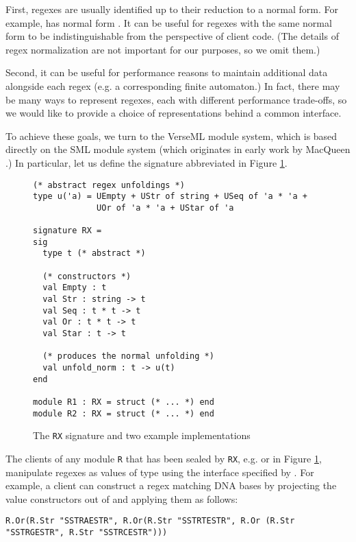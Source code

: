First, regexes are usually identified up to their reduction to a normal form. For example,  has normal form . It can be useful for regexes with the same normal form to be  indistinguishable from the perspective of client code. (The details of regex normalization are not important for our purposes, so we omit them.)

Second, it can be useful for performance reasons to maintain additional data alongside each regex (e.g. a corresponding finite automaton.) In fact, there may be many ways to represent regexes, each with different performance trade-offs, so we would like to provide a choice of representations behind a common interface.

To achieve these goals, we turn to the VerseML module system, which is based directly on the SML module system \cite{mthm97-for-dart,dreyer2005understanding} (which originates in early work by MacQueen \cite{MacQueen:1984:MSM:800055.802036}.) In particular, let us define the {signature} abbreviated  in Figure \ref{fig:signature-RX}.

\begin{figure}[ht]
\begin{lstlisting}[deletekeywords={case}]
(* abstract regex unfoldings *)
type u('a) = UEmpty + UStr of string + USeq of 'a * 'a + 
             UOr of 'a * 'a + UStar of 'a

signature RX = 
sig
  type t (* abstract *)

  (* constructors *)
  val Empty : t
  val Str : string -> t
  val Seq : t * t -> t
  val Or : t * t -> t
  val Star : t -> t

  (* produces the normal unfolding *)
  val unfold_norm : t -> u(t)
end

module R1 : RX = struct (* ... *) end
module R2 : RX = struct (* ... *) end
\end{lstlisting}
\vspace{-5px}
\caption{The \lstinline{RX} signature and two example implementations}
\label{fig:signature-RX}
\end{figure}

The clients of any module \lstinline{R} that has been sealed by \lstinline{RX}, e.g.  or   in Figure \ref{fig:signature-RX}, manipulate regexes as values of type  using the interface specified by . For example, a client can construct a regex matching DNA bases by projecting the value constructors out of  and applying them as follows:
\begin{lstlisting}[numbers=none]
R.Or(R.Str "SSTRAESTR", R.Or(R.Str "SSTRTESTR", R.Or (R.Str "SSTRGESTR", R.Str "SSTRCESTR")))
\end{lstlisting}

